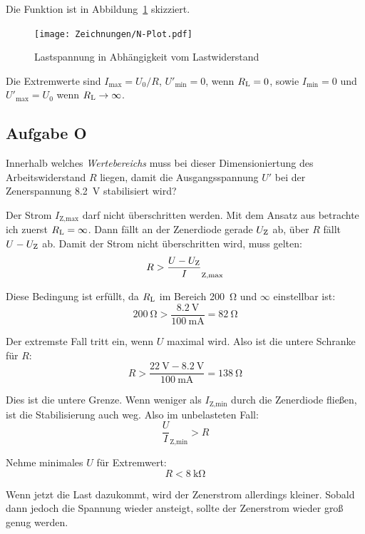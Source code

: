 Die Funktion ist in Abbildung~\ref{fig:N-Plot} skizziert.

\begin{figure}[htbp]
	\centering
	\texttt{[image: Zeichnungen/N-Plot.pdf]}
	\caption{%
		Lastspannung in Abhängigkeit vom Lastwiderstand
	}
	\label{fig:N-Plot}
\end{figure}

Die Extremwerte sind $I_\text{max} = U_0/R$, $U'_\text{min} = 0$, wenn $R_\text L =
0$, sowie $I_\text{min} = 0$ und $U'_\text{max} = U_0$ wenn $R_\text L \to \infty$.

\FloatBarrier
\subsection{Aufgabe O}
\label{ss:O}

\begin{problem}
	Innerhalb welches \emph{Wertebereichs} muss bei dieser Dimensioniertung
	des Arbeitswiderstand $R$ liegen, damit die Ausgangsspannung $U'$ bei der
	Zenerspannung \SI{8.2}{\volt} stabilisiert wird?
\end{problem}

\newcommand\IZmax{I_\text{Z,max}}
\newcommand\IZmin{I_\text{Z,min}}
\newcommand\IZ{I_\text Z}
\newcommand\UZ{U_\text Z}

Der Strom $\IZmax$ darf nicht überschritten werden. Mit dem Ansatz aus 
\cite[§15.1.3]{beuth/elementare_elektronik} betrachte ich zuerst $R_\text L =
\infty$. Dann fällt an der Zenerdiode gerade $\UZ$ ab, über $R$ fällt $U - \UZ$
ab. Damit der Strom nicht überschritten wird, muss gelten:
\[
	R > \frac{U - \UZ}\IZmax
\]

Diese Bedingung ist erfüllt, da $R_\text L$ im Bereich \SI{200}{\ohm} und
$\infty$ einstellbar ist:
\[
	\SI{200}\ohm > \frac{\SI{8.2}\volt}{\SI{100}{\milli\ampere}} = \SI{82}\ohm
\]

Der extremste Fall tritt ein, wenn $U$ maximal wird. Also ist die untere
Schranke für $R$:
\[
	R > \frac{\SI{22}\volt - \SI{8.2}\volt}{\SI{100}{\milli\ampere}}
	= \SI{138}\ohm
\]

Dies ist die untere Grenze. Wenn weniger als $\IZmin$ durch die Zenerdiode
fließen, ist die Stabilisierung auch weg. Also im unbelasteten Fall:
\[
	\frac U\IZmin > R
\]

Nehme minimales $U$ für Extremwert:
\[
	R < \SI{8}{\kilo\ohm}
\]

Wenn jetzt die Last dazukommt, wird der Zenerstrom allerdings kleiner. Sobald
dann jedoch die Spannung wieder ansteigt, sollte der Zenerstrom wieder groß
genug werden.

